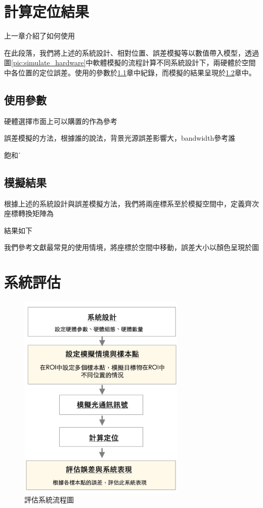\section{計算定位結果}
\label{chp:simulate_result}

上一章介紹了如何使用

在此段落，我們將上述的系統設計、相對位置、誤差模擬等以數值帶入模型，透過圖\ref{pic:simulate_hardware}中軟體模擬的流程計算不同系統設計下，兩硬體於空間中各位置的定位誤差。使用的參數於\ref{chp:simulate_para}章中紀錄，而模擬的結果呈現於\ref{chp:simulate_result_sub}章中。

\subsection{使用參數}
\label{chp:simulate_para}

硬體選擇市面上可以購置的作為參考

誤差模擬的方法，根據誰的說法，背景光源誤差影響大，bandwidth參考誰


飽和ˊ

\subsection{模擬結果}
\label{chp:simulate_result_sub}

根據上述的系統設計與誤差模擬方法，我們將兩座標系至於模擬空間中，定義齊次座標轉換矩陣為

結果如下



我們參考文獻最常見的使用情境，將座標於空間中移動，誤差大小以顏色呈現於圖










\section{系統評估}
\label{chp:evaluate}



\begin{figure}[ht]
    \centering
    \includegraphics[width=8cm]{ch4pic/evaluate_flow.png}
    \caption{評估系統流程圖}
    \label{pic:evaluate_flow}
\end{figure}

